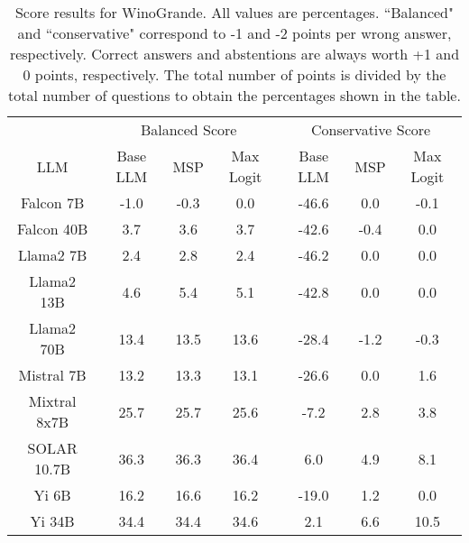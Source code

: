 \begin{table*}
\centering
\begin{tabular}{c|c|c|c|c|c|c}
& \multicolumn{3}{c|}{Balanced Score} & \multicolumn{3}{c}{Conservative Score} \\ 
LLM & Base LLM & MSP & Max Logit & Base LLM & MSP & Max Logit\\ \hline
Falcon 7B & -1.0 & -0.3 & 0.0 & -46.6 & 0.0 & -0.1\\
Falcon 40B & 3.7 & 3.6 & 3.7 & -42.6 & -0.4 & 0.0\\
Llama2 7B & 2.4 & 2.8 & 2.4 & -46.2 & 0.0 & 0.0\\
Llama2 13B & 4.6 & 5.4 & 5.1 & -42.8 & 0.0 & 0.0\\
Llama2 70B & 13.4 & 13.5 & 13.6 & -28.4 & -1.2 & -0.3\\
Mistral 7B & 13.2 & 13.3 & 13.1 & -26.6 & 0.0 & 1.6\\
Mixtral 8x7B & 25.7 & 25.7 & 25.6 & -7.2 & 2.8 & 3.8\\
SOLAR 10.7B & 36.3 & 36.3 & 36.4 & 6.0 & 4.9 & 8.1\\
Yi 6B & 16.2 & 16.6 & 16.2 & -19.0 & 1.2 & 0.0\\
Yi 34B & 34.4 & 34.4 & 34.6 & 2.1 & 6.6 & 10.5\\
\hline
\end{tabular}
\caption{Score results for WinoGrande. All values are percentages. ``Balanced" and ``conservative" correspond to -1 and -2 points per wrong answer, respectively. Correct answers and abstentions are always worth +1 and 0 points, respectively. The total number of points is divided by the total number of questions to obtain the percentages shown in the table.}
\label{tab:winogrande_score}
\end{table*}
